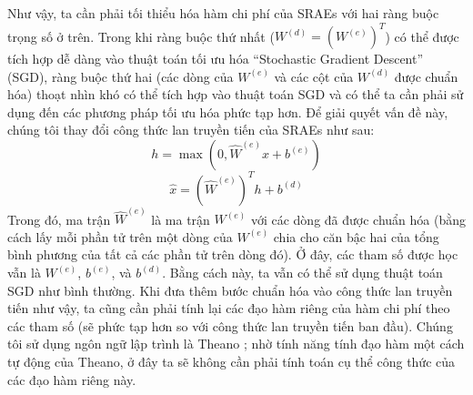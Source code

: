 Như vậy, ta cần phải tối thiểu hóa hàm chi phí của SRAEs với hai ràng buộc trọng số ở trên. Trong khi ràng buộc thứ nhất ($W^{(d)} = (W^{(e)})^T$) có thể được tích hợp dễ dàng vào thuật toán tối ưu hóa ``Stochastic Gradient Descent''  (SGD), ràng buộc thứ hai (các dòng của $W^{(e)}$ và các cột của $W^{(d)}$ được chuẩn hóa) thoạt nhìn khó có thể tích hợp vào thuật toán SGD và có thể ta cần phải sử dụng đến các phương pháp tối ưu hóa phức tạp hơn. Để giải quyết vấn đề này, chúng tôi thay đổi công thức lan truyền tiến của SRAEs như sau:
\begin{equation}
	h = \max(0, \hat{W}^{(e)}x + b^{(e)})
\end{equation}
\begin{equation}
	\hat{x} = (\hat{W}^{(e)})^Th + b^{(d)}
\end{equation}
Trong đó, ma trận $\hat{W}^{(e)}$ là ma trận $W^{(e)}$ với các dòng đã được chuẩn hóa (bằng cách lấy mỗi phần tử trên một dòng của $W^{(e)}$ chia cho căn bậc hai của tổng bình phương của tất cả các phần tử trên dòng đó). Ở đây, các tham số được học vẫn là $W^{(e)}$, $b^{(e)}$, và $b^{(d)}$. Bằng cách này, ta vẫn có thể sử dụng thuật toán SGD như bình thường. Khi đưa thêm bước chuẩn hóa vào công thức lan truyền tiến như vậy, ta cũng cần phải tính lại các đạo hàm riêng của hàm chi phí theo các tham số (sẽ phức tạp hơn so với công thức lan truyền tiến ban đầu). Chúng tôi sử dụng ngôn ngữ lập trình là Theano \cite{bergstra+al:2010-scipy}; nhờ tính năng tính đạo hàm một cách tự động của Theano, ở đây ta sẽ không cần phải tính toán cụ thể công thức của các đạo hàm riêng này.
